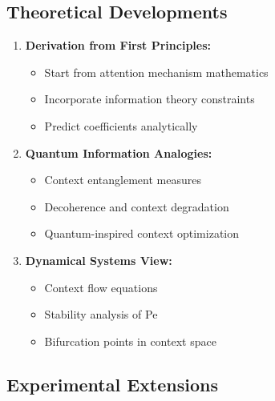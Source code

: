 \documentclass[conference]{IEEEtran}
\begin{document}
\subsection{Theoretical Developments}

\begin{enumerate}
\item \textbf{Derivation from First Principles:}
   \begin{itemize}
   \item Start from attention mechanism mathematics
   \item Incorporate information theory constraints
   \item Predict coefficients analytically
   \end{itemize}

\item \textbf{Quantum Information Analogies:}
   \begin{itemize}
   \item Context entanglement measures
   \item Decoherence and context degradation
   \item Quantum-inspired context optimization
   \end{itemize}

\item \textbf{Dynamical Systems View:}
   \begin{itemize}
   \item Context flow equations
   \item Stability analysis of Pe
   \item Bifurcation points in context space
   \end{itemize}
\end{enumerate}

\subsection{Experimental Extensions}
\end{document}
